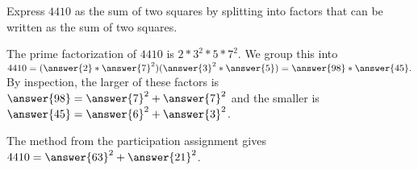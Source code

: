 \documentclass{ximera}
\begin{document}
\begin{example}
 Express $4410$ as the sum of two squares by splitting into factors that can be written as the sum of two squares.
 
 The prime factorization of $4410$ is $2*3^2*5*7^2$. We group this into $4410=(\answer{2}*\answer{7}^2)(\answer{3}^2*\answer{5})=\answer{98}*\answer{45}.$ By inspection, the larger of these factors is $\answer{98}=\answer{7}^2+\answer{7}^2$ and the smaller is $\answer{45}=\answer{6}^2+\answer{3}^2$.
 
 The method from the participation assignment gives $4410=\answer{63}^2+\answer{21}^2$.
\end{example}
\end{document}
